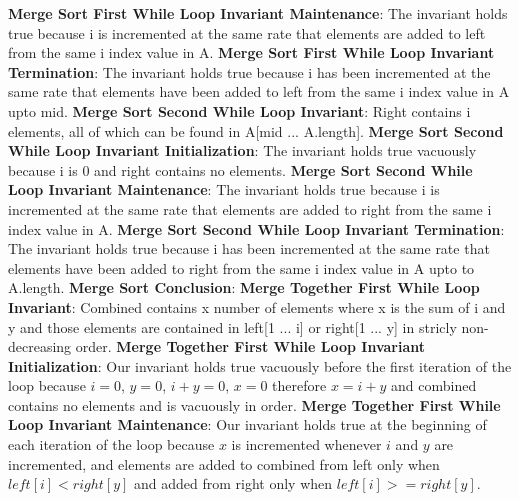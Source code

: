 \documentclass[onecolumn, 12pt, article]{IEEEtran}
\numberwithin{case}{problem}
\numberwithin{condition}{problem}
\numberwithin{condition}{subsection}
\numberwithin{definition}{section}
\theoremstyle{remark}
\numberwithin{question}{problem}
\theoremstyle{plain}
\numberwithin{answer}{problem}
\numberwithin{solution}{section}
\numberwithin{equation}{section}%
\begin{document}
\textbf{Merge Sort First While Loop Invariant Maintenance}: The invariant holds true because i is incremented at the same rate that elements are added to left from the same i index value in A.
\newline
\textbf{Merge Sort First While Loop Invariant Termination}: The invariant holds true because i has been incremented at the same rate that elements have been added to left from the same i index value in A upto mid.
\newline
\newline
\textbf{Merge Sort Second While Loop Invariant}: Right contains i elements, all of which can be found in A[mid ... A.length].
\newline
\textbf{Merge Sort Second While Loop Invariant Initialization}: The invariant holds true vacuously because i is 0 and right contains no elements.
\newline
\textbf{Merge Sort Second While Loop Invariant Maintenance}: The invariant holds true because i is incremented at the same rate that elements are added to right from the same i index value in A.
\newline
\textbf{Merge Sort Second While Loop Invariant Termination}: The invariant holds true because i has been incremented at the same rate that elements have been added to right from the same i index value in A upto to A.length.
\newline
\newline
\textbf{Merge Sort Conclusion}: %
\newline
\newline
\textbf{Merge Together First While Loop Invariant}: Combined contains x number of elements where x is the sum of i and y and those elements are contained in left[1 ... i] or right[1 ... y] in stricly non-decreasing order.
\newline
\textbf{Merge Together First While Loop Invariant Initialization}: Our invariant holds true vacuously before the first iteration of the loop because $i = 0$, $y = 0$, $i + y = 0$, $x = 0$ therefore $x = i + y$ and combined contains no elements and is vacuously in order.
\newline
\textbf{Merge Together First While Loop Invariant Maintenance}: Our invariant holds true at the beginning of each iteration of the loop because $x$ is incremented whenever $i$ and $y$ are incremented, and elements are added to combined from left only when $left[i] < right[y]$ and added from right only when $left[i] >= right[y]$.
\newline
\end{document}
